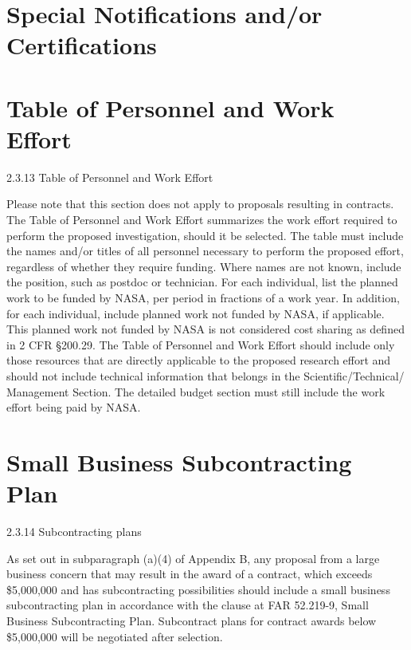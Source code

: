 \documentclass[12pt]{article}
\begin{document}

\cleardoublepage

\section*{Special Notifications and/or Certifications}



\cleardoublepage

\section*{Table of Personnel and Work Effort}
2.3.13 Table of Personnel and Work Effort

Please note that this section does not apply to proposals resulting in
contracts. The Table of Personnel and Work Effort summarizes the work
effort required to perform the proposed investigation, should it be
selected. The table must include the names and/or titles of all
personnel necessary to perform the proposed effort, regardless of
whether they require funding. Where names are not known, include the
position, such as postdoc or technician. For each individual, list the
planned work to be funded by NASA, per period in fractions of a work
year. In addition, for each individual, include planned work not
funded by NASA, if applicable. This planned work not funded by NASA is
not considered cost sharing as defined in 2 CFR \S 200.29. The Table of
Personnel and Work Effort should include only those resources that are
directly applicable to the proposed research effort and should not
include technical information that belongs in the
Scientific/Technical/ Management Section. The detailed budget section
must still include the work effort being paid by NASA.



\cleardoublepage

\section*{Small Business Subcontracting Plan}
2.3.14 Subcontracting plans

As set out in subparagraph (a)(4) of Appendix B, any proposal from a
large business concern that may result in the award of a contract,
which exceeds \$5,000,000 and has subcontracting possibilities should
include a small business subcontracting plan in accordance with the
clause at FAR 52.219-9, Small Business Subcontracting
Plan. Subcontract plans for contract awards below \$5,000,000 will be
negotiated after selection.
\end{document}
